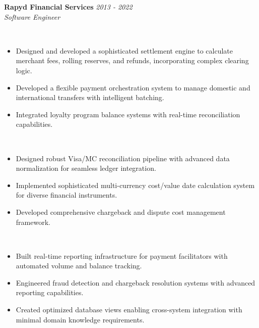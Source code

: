 \documentclass[a4paper,10pt]{article}
\newcommand{\workentry}[4]{%
    \noindent
    {\headingfont\large\textbf{#1}} \hfill {\small\textit{#2}}\\[0.1cm]     
    {\small\textit{#3}}\\[0.1cm]
    #4
    \vspace{0.3cm}
  }
\begin{document}
  \workentry{Rapyd Financial Services}{2013 - 2022}{Software Engineer}{
  \begin{description}[
    leftmargin=1em,
    labelwidth=0pt,
    itemindent=0pt,
    listparindent=0pt,
    parsep=0.1cm,    %
    itemsep=0.1cm    %
  ]
  \vspace{-0.4cm}  %

    \item[\textbf{Payment Processing \& Settlement}]\mbox{}\\ %
    \vspace{-0.4cm}  %
      \begin{itemize}[leftmargin=1em, topsep=0pt]
        \item Designed and developed a sophisticated settlement engine to calculate merchant fees, rolling reserves, and refunds, incorporating complex clearing logic.
        \item Developed a flexible payment orchestration system to manage domestic and international transfers with intelligent batching.
        \item Integrated loyalty program balance systems with real-time reconciliation capabilities.
      \end{itemize}
    \item[\textbf{Financial Systems Integration}]\mbox{}\\
    \vspace{-0.4cm}
      \begin{itemize}[leftmargin=1em, topsep=0pt]
        \item Designed robust Visa/MC reconciliation pipeline with advanced data normalization for seamless ledger integration.
        \item Implemented sophisticated multi-currency cost/value date calculation system for diverse financial instruments.
        \item Developed comprehensive chargeback and dispute cost management framework.
      \end{itemize}
    \item[\textbf{Reporting \& Risk Management}]\mbox{}\\
    \vspace{-0.4cm}
      \begin{itemize}[leftmargin=1em, topsep=0pt]
        \item Built real-time reporting infrastructure for payment facilitators with automated volume and balance tracking.
        \item Engineered fraud detection and chargeback resolution systems with advanced reporting capabilities.
        \item Created optimized database views enabling cross-system integration with minimal domain knowledge requirements.
      \end{itemize}
  

\end{description}}
\end{document}
